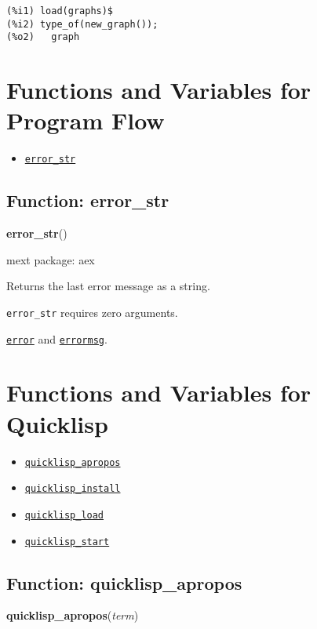 \documentclass[]{article}
\begin{document}
\begin{Verbatim}[frame=single]
(%i1) load(graphs)$
(%i2) type_of(new_graph());
(%o2)   graph
\end{Verbatim}


\section{Functions and Variables for Program Flow}
\begin{itemize}
\item \hyperlink{error_str}{{\tt error\_str}}
\end{itemize}
\subsection{Function: error\_str\label{sec:error_str}}
\hypertarget{error_str}{}
{\bf error\_str}()


\noindent mext package: aex



\vspace{5 pt}
Returns the last error message as a string. 

\vspace{5 pt}

   {\tt error\_str} requires zero arguments.


\vspace{5 pt}


 \hyperlink{error}{{\tt error}} and \hyperlink{errormsg}{{\tt errormsg}}.

\vspace{5 pt}


\section{Functions and Variables for Quicklisp}
\begin{itemize}
\item \hyperlink{quicklisp_apropos}{{\tt quicklisp\_apropos}}
\item \hyperlink{quicklisp_install}{{\tt quicklisp\_install}}
\item \hyperlink{quicklisp_load}{{\tt quicklisp\_load}}
\item \hyperlink{quicklisp_start}{{\tt quicklisp\_start}}
\end{itemize}
\subsection{Function: quicklisp\_apropos\label{sec:quicklisp_apropos}}
\hypertarget{quicklisp_apropos}{}
{\bf quicklisp\_apropos}({\it term})
\end{document}
